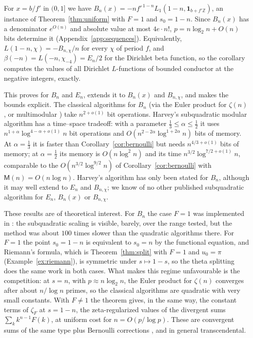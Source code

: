 \documentclass[11pt,reqno]{amsart}
\theoremstyle{definition}
\theoremstyle{remark}
\newcommand{\ZZ}{\mathbb{Z}}
\newcommand{\Mul}{\mathsf{M}}
\begin{document}
For $x = b/f'$ in $(0, 1]$ we have $B_n(x) = -nf'^{\,1-n}L_1(1-n, \mathbf 1_{b+f'\ZZ})$, an instance of
Theorem~\ref{thm:uniform} with $F = 1$ and $s_0 = 1 - n$. Since $B_n(x)$ has a denominator $e^{O(n)}$ and absolute value
at most $4e\cdot n!$, $p = n\log_2n + O(n)$ bits determine it (Appendix~\ref{app:sequences}). Equivalently,
$L(1-n,\chi) = -B_{n,\chi}/n$ for every $\chi$ of period $f$, and $\beta(-n) = L(-n, \chi_{-4}) = E_n/2$ for the
Dirichlet beta function, so the corollary computes the values of all Dirichlet $L$-functions of bounded conductor at
the negative integers, exactly.

This proves \cite[Theorem~2]{Joh21} for $B_n$ and $E_n$, extends it to $B_n(x)$ and $B_{n,\chi}$, and makes the bounds
explicit. The classical algorithms for $B_n$ (via the Euler product for $\zeta(n)$, or multimodular \cite{Har10}) take
$n^{2+o(1)}$ bit operations. Harvey's subquadratic modular algorithm \cite{Har14} has
a time--space tradeoff: with a parameter $\frac13 \le \alpha \le \frac12$ it uses $n^{1+\alpha}\log^{4-\alpha+o(1)}n$
bit operations and $O(n^{2-2\alpha}\log^{1+2\alpha}n)$ bits of memory.
At $\alpha = \frac13$ it is faster than Corollary~\ref{cor:bernoulli} but needs $n^{4/3+o(1)}$ bits of memory;
at $\alpha = \frac12$ its memory is $O(n\log^2n)$ and its time $n^{3/2}\log^{7/2+o(1)}n$, comparable to the $O(n^{3/2}\log^{9/2}n)$ of
Corollary~\ref{cor:bernoulli} with $\Mul(n) = O(n\log n)$.
Harvey's algorithm has only been stated for $B_n$, although
it may well extend to $E_n$ and $B_{n,\chi}$; we know of no other published subquadratic algorithm for $E_n$,
$B_n(x)$ or $B_{n,\chi}$.

These results are of theoretical interest. For $B_n$ the case $F = 1$ was implemented in \cite{Joh21}: the
subquadratic scaling is visible, barely, over the range tested, but the method was about $100$ times slower than the
quadratic algorithms there. For $F = 1$ the point $s_0 = 1 - n$ is equivalent to $s_0 = n$ by the functional
equation, and Riemann's formula, which is Theorem~\ref{thm:split} with $F = 1$ and $u_0 = \pi$
(Example~\ref{ex:riemann}), is symmetric under $s \mapsto 1-s$, so the theta splitting does the same work in both
cases. What makes this regime unfavourable is the competition: at $s = n$, with $p \approx n\log_2n$, the Euler
product for $\zeta(n)$ converges after about $n/\log n$ primes, so the classical algorithms are quadratic with very
small constants. With $F \ne 1$ the theorem gives, in the same way, the constant terms
of $\zeta_F$ at $s = 1-n$, the zeta-regularized values of the divergent sums $\sum_kk^{n-1}F(k)$, at uniform cost for
$n = O(p/\log p)$. These are convergent sums of the same type plus Bernoulli corrections \cite{Joh26}, and in general
transcendental.
\end{document}
